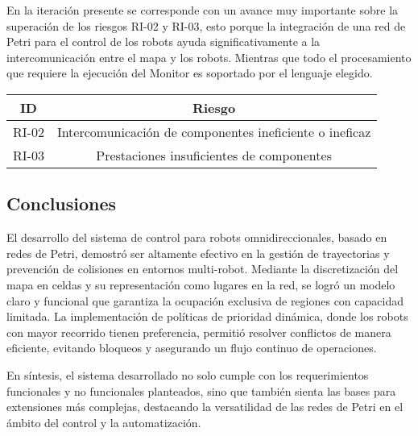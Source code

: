 En la iteración presente se corresponde con un avance muy importante sobre la superación de los riesgos RI-02 y RI-03, esto porque la integración de una red de Petri para el control de los robots ayuda significativamente a la intercomunicación entre el mapa y los robots. Mientras que todo el procesamiento que requiere la ejecución del Monitor es soportado por el lenguaje elegido.

\begin{center}
    \begin{tabular} {
        | c| c |}
        \hline \rowcolor{test_header_color}
            ID & Riesgo \\
        \hline
            RI-02 & Intercomunicación de componentes ineficiente o ineficaz \\
        \hline
            RI-03 & Prestaciones insuficientes de componentes \\
        \hline
    \end{tabular}
\end{center}

\subsection{Conclusiones}
El desarrollo del sistema de control para robots omnidireccionales, basado en redes de Petri, demostró ser altamente efectivo en la gestión de trayectorias y prevención de colisiones en entornos multi-robot. Mediante la discretización del mapa en celdas y su representación como lugares en la red, se logró un modelo claro y funcional que garantiza la ocupación exclusiva de regiones con capacidad limitada. La implementación de políticas de prioridad dinámica, donde los robots con mayor recorrido tienen preferencia, permitió resolver conflictos de manera eficiente, evitando bloqueos y asegurando un flujo continuo de operaciones.

En síntesis, el sistema desarrollado no solo cumple con los requerimientos funcionales y no funcionales planteados, sino que también sienta las bases para extensiones más complejas, destacando la versatilidad de las redes de Petri en el ámbito del control y la automatización.